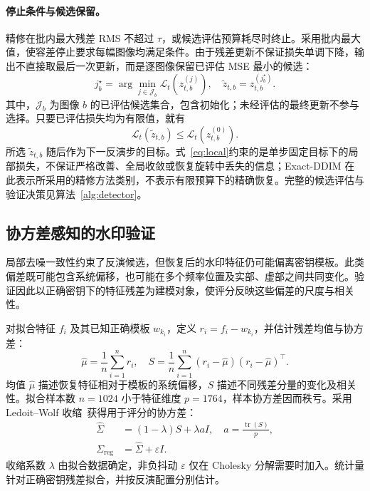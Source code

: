 \documentclass[10pt,twocolumn,letterpaper]{article}
\begin{document}
\paragraph{停止条件与候选保留。}
精修在批内最大残差 RMS 不超过 $\tau$，或候选评估预算耗尽时终止。采用批内最大值，使容差停止要求每幅图像均满足条件。由于残差更新不保证损失单调下降，输出不直接取最后一次更新，而是逐图像保留已评估 MSE 最小的候选：
\begin{equation}j_b^\star=\arg\min_{j\in\mathcal J_b}\mathcal L_t(z_{t,b}^{(j)}),\quad\widetilde z_{t,b}=z_{t,b}^{(j_b^\star)}.\label{eq:best}\end{equation}
其中，$\mathcal J_b$ 为图像 $b$ 的已评估候选集合，包含初始化；未经评估的最终更新不参与选择。只要已评估损失均为有限值，就有
\begin{equation}\mathcal L_t(\widetilde z_{t,b})\leq\mathcal L_t(z_{t,b}^{(0)}).\label{eq:local}\end{equation}
所选 $\widetilde z_{t,b}$ 随后作为下一反演步的目标。式~\eqref{eq:local}约束的是单步固定目标下的局部损失，不保证严格改善、全局收敛或恢复旋转中丢失的信息；Exact-DDIM 在此表示所采用的精修方法类别，不表示有限预算下的精确恢复。完整的候选评估与验证决策见算法~\ref{alg:detector}。


\subsection{协方差感知的水印验证}

局部去噪一致性约束了反演候选，但恢复后的水印特征仍可能偏离密钥模板。此类偏差既可能包含系统偏移，也可能在多个频率位置及实部、虚部之间共同变化。验证因此以正确密钥下的特征残差为建模对象，使评分反映这些偏差的尺度与相关性。

对拟合特征 $f_i$ 及其已知正确模板 $w_{k_i}$，定义 $r_i=f_i-w_{k_i}$，并估计残差均值与协方差：
\begin{equation}\widehat\mu=\frac1n\sum_{i=1}^nr_i,\quad S=\frac1n\sum_{i=1}^n(r_i-\widehat\mu)(r_i-\widehat\mu)^\top.\label{eq:stats}\end{equation}
均值 $\widehat\mu$ 描述恢复特征相对于模板的系统偏移，$S$ 描述不同残差分量的变化及相关性。拟合样本数 $n=1024$ 小于特征维度 $p=1764$，样本协方差因而秩亏。采用 Ledoit--Wolf 收缩~\cite{ledoit2004}获得用于评分的协方差：
\begin{equation}\begin{aligned}\widehat\Sigma&=(1-\lambda)S+\lambda aI,\quad a=\frac{\operatorname{tr}(S)}p,\\\Sigma_{\mathrm{reg}}&=\widehat\Sigma+\varepsilon I.\end{aligned}\label{eq:shrinkage}\end{equation}
收缩系数 $\lambda$ 由拟合数据确定，非负抖动 $\varepsilon$ 仅在 Cholesky 分解需要时加入。统计量针对正确密钥残差拟合，并按反演配置分别估计。
\end{document}
